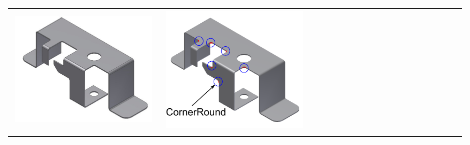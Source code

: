 \begin{minipage}[t]{\linewidth}
\begin{tabular}[!h]{@{} p{0.3\linewidth} | p{0.3\linewidth} | p{0.3\linewidth}@{}}
\includegraphics[width=0.98\linewidth]{images/DefeatPhase_I_1} &
\includegraphics[width=0.98\linewidth]{images/DefeatPhase_I_2_new_nolables.pdf} &

\end{tabular}
\end{minipage}
